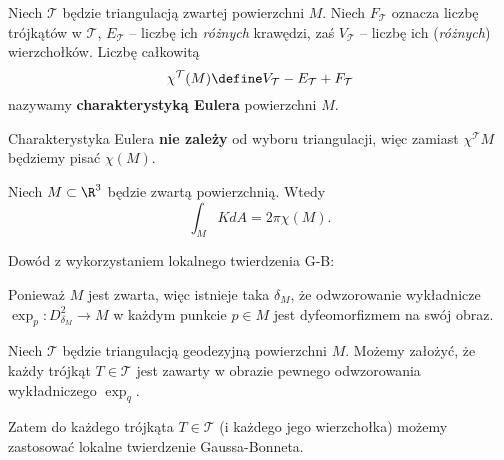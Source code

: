 \begin{frame}

\begin{definicja}
Niech $\mathcal{T}$ będzie triangulacją zwartej powierzchni $M$. Niech $F_\mathcal{T}$ oznacza liczbę trójkątów w $\mathcal{T}$, $E_\mathcal{T}$ -- liczbę ich \textit{różnych} krawędzi, zaś $V_\mathcal{T}$ -- liczbę ich (\textit{różnych}) wierzchołków. \pause Liczbę całkowitą
\[\chi^\mathcal{T}(M)\define V_\mathcal{T}-E_\mathcal{T}+F_\mathcal{T}\]nazywamy \textbf{charakterystyką Eulera} powierzchni $M$.
\end{definicja}

\pause \begin{uwaga}
Charakterystyka Eulera \textbf{nie zależy} od wyboru triangulacji, więc zamiast $\chi^\mathcal{T}M$ będziemy pisać $\chi(M)$. 
\end{uwaga}

\end{frame}
\begin{frame}

\begin{twierdzenie}
Niech $M\subset \R^3$ będzie zwartą powierzchnią. Wtedy 
\[\int_M K dA=2\pi \chi(M).\]
\end{twierdzenie}

\end{frame}
\begin{frame}
\textcolor{ared}{Dowód z wykorzystaniem lokalnego twierdzenia G-B:}\\\pause

Ponieważ $M$ jest zwarta, więc istnieje taka $\delta_M$, że odwzorowanie wykładnicze $\exp_p\colon D^2_{\delta_M}\to M$ w każdym punkcie $p\in M$ jest dyfeomorfizmem na swój obraz.\pause 

Niech $\mathcal{T}$ będzie triangulacją geodezyjną powierzchni $M$. Możemy założyć, że każdy trójkąt $T\in \mathcal{T}$ jest zawarty w obrazie pewnego odwzorowania wykładniczego $\exp_q$.\pause 

Zatem do każdego trójkąta $T\in \mathcal{T}$ (i każdego jego wierzchołka) możemy zastosować lokalne twierdzenie Gaussa-Bonneta.


\end{frame}

